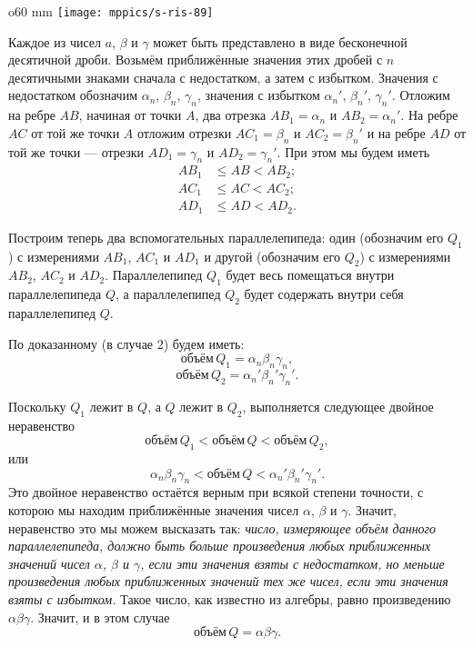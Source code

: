 \begin{wrapfigure}{o}{60 mm}
\vskip-0mm
\centering
\texttt{[image: mppics/s-ris-89]}
\caption{}\label{1938/s-ris-89}
\vskip-0mm
\end{wrapfigure}

Каждое из чисел $a$, $\beta$ и $\gamma$ может быть представлено в виде бесконечной десятичной дроби.
Возьмём приближённые значения этих дробей с $n$ десятичными знаками сначала с недостатком, а затем с избытком.
Значения с недостатком обозначим $\alpha_n$, $\beta_n$, $\gamma_n$, значения с избытком $\alpha_n'$, $\beta_n'$, $\gamma_n'$.
Отложим на ребре $AB$, начиная от точки $A$, два отрезка $AB_1 = \alpha_n$ и $AB_2=\alpha_n'$.
На ребре $AC$ от той же точки $A$ отложим отрезки $AC_1=\beta_n$ и $AC_2=\beta_n'$ и на ребре $AD$ от той же точки — отрезки $AD_1=\gamma_n$ и $AD_2=\gamma_n'$.
При этом мы будем иметь
\begin{align*}
AB_1&\le AB<AB_2;
\\
AC_1&\le AC<AC_2;
\\ 
AD_1&\le AD<AD_2.
\end{align*}

Построим теперь два вспомогательных параллелепипеда: один (обозначим его $Q_1$) с измерениями $AB_1$, $AC_1$ и $AD_1$ и другой (обозначим его $Q_2$) с измерениями $AB_2$, $AC_2$ и $AD_2$.
Параллелепипед $Q_1$ будет весь помещаться внутри параллелепипеда $Q$, а параллелепипед $Q_2$ будет содержать внутри себя параллелепипед $Q$.

По доказанному (в случае 2) будем иметь:
\[\text{объём}\, Q_1 = \alpha_n\beta_n\gamma_n, \]
\[\text{объём}\, Q_2 = \alpha_n'\beta_n'\gamma_n'.\]

Поскольку $Q_1$ лежит в $Q$, а $Q$ лежит в $Q_2$, выполняется следующее двойное неравенство
\[\text{объём}\, Q_1 < \text{объём}\, Q <\text{объём}\, Q_2,\]
или 
\[\alpha_n\beta_n\gamma_n < \text{объём}\, Q <\alpha_n'\beta_n'\gamma_n'.\]
Это двойное неравенство остаётся верным при всякой степени точности, с которою мы находим приближённые значения чисел $\alpha$, $\beta$ и $\gamma$.
Значит, неравенство это мы можем высказать так: \emph{число, измеряющее объём данного параллелепипеда, должно быть больше произведения любых приближенных значений чисел $\alpha$, $\beta$ и $\gamma$, если эти значения взяты с недостатком, но меньше произведения любых приближенных значений тех же чисел, если эти значения взяты с избытком.}
Такое число, как известно из алгебры, равно произведению $\alpha\beta\gamma$.
Значит, и в этом случае
\[\text{объём}\, Q=\alpha\beta\gamma.\]

